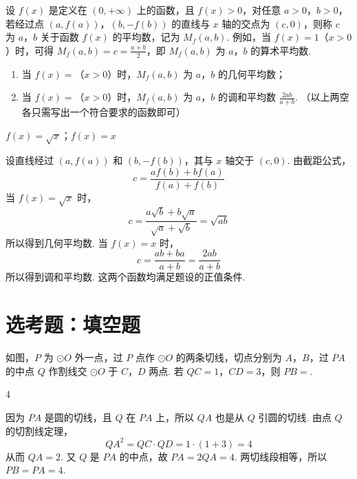 \begin{problem}
设 \( f(x) \) 是定义在 \((0, +\infty)\) 上的函数，且 \( f(x) > 0 \)，对任意 \(a > 0\)，\(b > 0\)，若经过点 \((a, f(a))\)，\((b, -f(b))\) 的直线与 \( x \) 轴的交点为 \((c, 0)\)，则称 \( c \) 为 \(a\)，\(b\) 关于函数 \( f(x) \) 的平均数，记为 \( M_{f}(a,b) \). 例如，当 \( f(x)=1 \)（\(x>0\)）时，可得 \( M_{f}(a,b)=c=\frac{a+b}{2} \)，即 \( M_{f}(a,b) \) 为 \(a\)，\(b\) 的算术平均数.
\begin{enumerate}
\item 当 \( f(x)=\)\fillinblank{}（\(x>0\)）时，\( M_f(a, b) \) 为 \(a\)，\(b\) 的几何平均数；
\item 当 \( f(x)=\)\fillinblank{}（\(x>0\)）时，\( M_f(a, b) \) 为 \(a\)，\(b\) 的调和平均数 \(\frac{2ab}{a + b}\). （以上两空各只需写出一个符合要求的函数即可）
\end{enumerate}
\end{problem}

\begin{answer}
\(f(x)=\sqrt{x}\)；\(f(x)=x\)
\end{answer}

\begin{solution}
设直线经过 \((a,f(a))\) 和 \((b,-f(b))\)，其与 \(x\) 轴交于 \((c,0)\). 由截距公式，
\[
c=\frac{a f(b)+b f(a)}{f(a)+f(b)}
\]
当 \(f(x)=\sqrt{x}\) 时，
\[
c=\frac{a\sqrt b+b\sqrt a}{\sqrt a+\sqrt b}=\sqrt{ab}
\]
所以得到几何平均数. 当 \(f(x)=x\) 时，
\[
c=\frac{ab+ba}{a+b}=\frac{2ab}{a+b}
\]
所以得到调和平均数. 这两个函数均满足题设的正值条件.
\end{solution}

\section{选考题：填空题}

\begin{problem}
如图，\(P\) 为 \( \odot O \) 外一点，过 \(P\) 点作 \( \odot O \) 的两条切线，切点分别为 \(A\)，\(B\)，过 \(PA\) 的中点 \(Q\) 作割线交 \( \odot O \) 于 \(C\)，\(D\) 两点. 若 \(QC = 1\)，\(CD = 3\)，则 \(PB =\)\fillinblank{}.

\end{problem}

\begin{answer}
4
\end{answer}

\begin{solution}
因为 \(PA\) 是圆的切线，且 \(Q\) 在 \(PA\) 上，所以 \(QA\) 也是从 \(Q\) 引圆的切线. 由点 \(Q\) 的切割线定理，
\[
QA^2=QC\cdot QD=1\cdot(1+3)=4
\]
从而 \(QA=2\). 又 \(Q\) 是 \(PA\) 的中点，故 \(PA=2QA=4\). 两切线段相等，所以 \(PB=PA=4\).
\end{solution}

